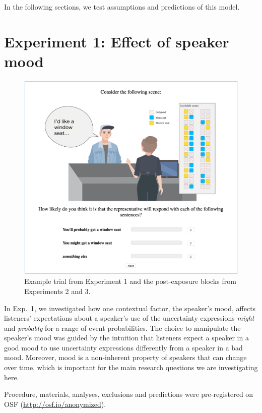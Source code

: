 \documentclass[man,floatsintext]{apa6}
\begin{document}
In the following sections, we test assumptions and predictions of this model. 



\section{Experiment 1: Effect of speaker mood}

\begin{figure}
    \centering
    \includegraphics[width=0.6\columnwidth, trim={0 1cm 0 0cm}]{example-trial.png}
    \caption{Example trial from Experiment 1 and the post-exposure blocks from Experiments 2 and 3.}
    \label{fig:example-trial}
\end{figure}

In Exp.~1, we investigated how one contextual factor, the speaker's mood, affects listeners' expectations about a speaker's use of the uncertainty expressions \textit{might} and \textit{probably} for a range of event probabilities. The choice to manipulate the speaker's mood was guided by the intuition that listeners expect a speaker in a good mood to use uncertainty expressions differently from a speaker in a bad mood. Moreover, mood is a non-inherent property of speakers that can change over time, which is important for the main research questions we are investigating here. 

Procedure, materials, analyses, exclusions and predictions were pre-registered on OSF (\url{http://osf.io/anonymized}).
\end{document}
